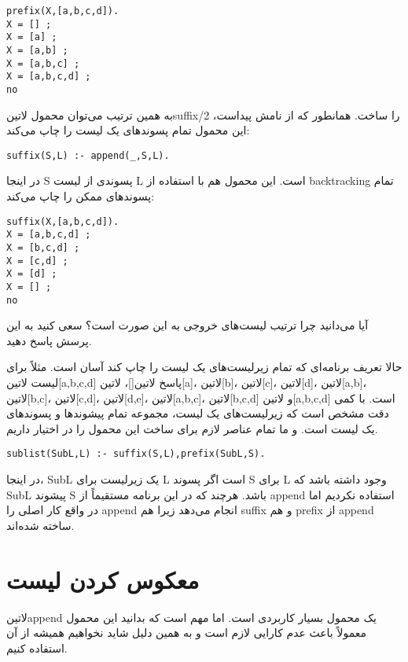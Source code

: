 \begin{latin}
\begin{lstlisting}
prefix(X,[a,b,c,d]).
X = [] ;
X = [a] ;
X = [a,b] ;
X = [a,b,c] ;
X = [a,b,c,d] ;
no
\end{lstlisting}
\end{latin}

به همین ترتیب می‌توان محمول ‌لاتین{suffix/2} را ساخت. همانطور که از نامش پیداست، این محمول تمام پسوندهای یک لیست را چاپ می‌کند:

\begin{latin}
\begin{lstlisting}
suffix(S,L) :- append(_,S,L).
\end{lstlisting}
\end{latin}

در اینجا S پسوندی از لیست L است. این محمول هم با استفاده از backtracking تمام پسوندهای ممکن را چاپ می‌کند:

\begin{latin}
\begin{lstlisting}
suffix(X,[a,b,c,d]).
X = [a,b,c,d] ;
X = [b,c,d] ;
X = [c,d] ;
X = [d] ;
X = [] ;
no
\end{lstlisting}
\end{latin}

آیا می‌دانید چرا ترتیب لیست‌های خروجی به این صورت است؟ سعی کنید به این پرسش پاسخ دهید.

حالا تعریف برنامه‌ای که تمام زیرلیست‌های یک لیست را چاپ کند آسان است. مثلاً برای لیست ‌لاتین{[a,b,c,d]} پاسخ ‌لاتین{[]}، ‌لاتین{[a]}، ‌لاتین{[b]}، ‌لاتین{[c]}، ‌لاتین{[d]}، ‌لاتین{[a,b]}، ‌لاتین{[b,c]}، ‌لاتین{[c,d]}، ‌لاتین{[d,e]}، ‌لاتین{[a,b,c]}، ‌لاتین{[b,c,d]} و ‌لاتین{[a,b,c,d]} است. با کمی دقت مشخص است که زیرلیست‌های یک لیست، مجموعه تمام پیشوندها و پسوندهای یک لیست است. و ما تمام عناصر لازم برای ساخت این محمول را در اختیار داریم.

\begin{latin}
\begin{lstlisting}
sublist(SubL,L) :- suffix(S,L),prefix(SubL,S).
\end{lstlisting}
\end{latin}

در اینجا، SubL یک زیرلیست برای L است اگر پسوند S برای L وجود داشته باشد که SubL پیشوند S باشد. هرچند که در این برنامه مستقیماً از append استفاده نکردیم اما در واقع کار اصلی را append انجام می‌دهد زیرا هم suffix و هم prefix از append ساخته شده‌اند.

\section{معکوس کردن لیست}
‌لاتین{append} یک محمول بسیار کاربردی است. اما مهم است که بدانید این محمول معمولاً باعث عدم کارایی لازم است و به همین دلیل شاید نخواهیم همیشه از آن استفاده کنیم.

